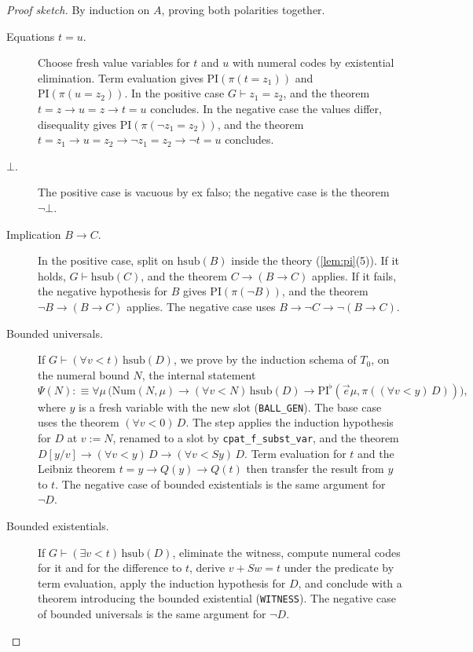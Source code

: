 \documentclass[11pt]{article}
\theoremstyle{plain}
\theoremstyle{definition}
\theoremstyle{remark}
\newcommand{\T}[1]{T_{#1}}
\newcommand{\Num}{\mathrm{Num}}
\newcommand{\PRI}{\mathrm{PI}}
\newcommand{\rocq}[1]{\texttt{#1}}
\begin{document}
\begin{proof}[Proof sketch]
By induction on $A$, proving both polarities together.
\begin{description}
  \item[Equations $t = u$.] Choose fresh value variables for $t$ and $u$
    with numeral codes by existential elimination.  Term evaluation gives
    $\PRI(\pi(t = z_1))$ and $\PRI(\pi(u = z_2))$.  In the positive case
    $G \vdash z_1 = z_2$, and the theorem
    $t = z \to u = z \to t = u$ concludes.  In the negative case the
    values differ, disequality gives $\PRI(\pi(\neg z_1 = z_2))$, and
    the theorem $t = z_1 \to u = z_2 \to \neg z_1 = z_2 \to \neg t = u$
    concludes.
  \item[$\bot$.] The positive case is vacuous by ex falso; the negative
    case is the theorem $\neg\bot$.
  \item[Implication $B \to C$.] In the positive case, split on
    $\mathrm{hsub}(B)$ inside the theory (\cref{lem:pi}(5)).  If it
    holds, $G \vdash \mathrm{hsub}(C)$, and the theorem
    $C \to (B \to C)$ applies.  If it fails, the negative hypothesis for
    $B$ gives $\PRI(\pi(\neg B))$, and the theorem
    $\neg B \to (B \to C)$ applies.  The negative case uses
    $B \to \neg C \to \neg(B \to C)$.
  \item[Bounded universals.] If
    $G \vdash (\forall v < t)\,\mathrm{hsub}(D)$, we prove by the
    induction schema of $\T0$, on the numeral bound $N$, the internal
    statement
    \[
      \Psi(N) :\equiv \forall \mu\,\bigl(\Num(N,\mu) \to
      (\forall v<N)\,\mathrm{hsub}(D) \to
      \mathrm{PI}^{\flat}(\vec e\mu, \pi((\forall v < y)\,D))\bigr),
    \]
    where $y$ is a fresh variable with the new slot (\rocq{BALL\_GEN}).
    The base case uses the theorem $(\forall v < 0)\,D$.  The step
    applies the induction hypothesis for $D$ at $v := N$, renamed to a
    slot by \rocq{cpat\_f\_subst\_var}, and the theorem
    $D[y/v] \to (\forall v<y)\,D \to (\forall v < Sy)\,D$.  Term
    evaluation for $t$ and the Leibniz theorem $t = y \to Q(y) \to Q(t)$
    then transfer the result from $y$ to $t$.  The negative case of
    bounded existentials is the same argument for $\neg D$.
  \item[Bounded existentials.] If $G \vdash (\exists v < t)\,\mathrm{hsub}(D)$,
    eliminate the witness, compute numeral codes for it and for the
    difference to $t$, derive $v + S w = t$ under the predicate by term
    evaluation, apply the induction hypothesis for $D$, and conclude with
    a theorem introducing the bounded existential (\rocq{WITNESS}).  The
    negative case of bounded universals is the same argument for
    $\neg D$.  \qedhere
\end{description}
\end{proof}
\end{document}
